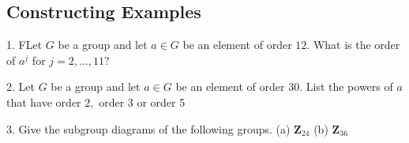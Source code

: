 \subsection{Constructing Examples}
\begin{mdframed}[style=darkQuesion]
  1. FLet $G$ be a group and let $a \in G$ be an element of order $12 .$ What is the order of $a^{j}$ for $j=2, \ldots, 11 ?$
\end{mdframed}
\begin{mdframed}[style=darkAnswer,frametitle={Joe Starr}]
  
\end{mdframed}
\newpage
\begin{mdframed}[style=darkQuesion]
2. Let $G$ be a group and let $a \in G$ be an element of order $30 .$ List the powers of $a$ that have order $2,$ order 3 or order 5
\end{mdframed}
\begin{mdframed}[style=darkAnswer,frametitle={Joe Starr}]
  
\end{mdframed}
\newpage
\begin{mdframed}[style=darkQuesion]
3. Give the subgroup diagrams of the following groups.
(a) $\mathbf{Z}_{24}$
(b) $\mathbf{Z}_{36}$
\end{mdframed}
\begin{mdframed}[style=darkAnswer,frametitle={Joe Starr}]
  
\end{mdframed}
